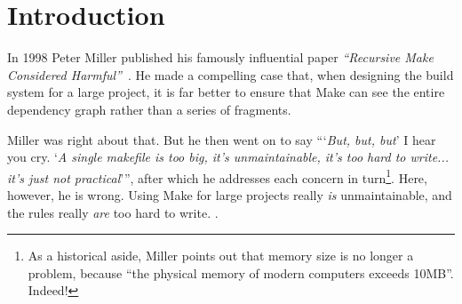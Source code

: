 \section{Introduction}

In 1998 Peter Miller published his famously influential paper
\emph{``Recursive Make Considered Harmful''}~\cite{miller:recursive_make}.
He made a compelling case that, when designing the build system for
a large project, it is far better to ensure that Make can see
the entire dependency graph rather than a series of fragments.

Miller was right about that.  But he then went on to say ```\emph{But, but, but}'
I hear you cry.  `\emph{A single makefile is too big, it's unmaintainable,
it's too hard to write... it's just not practical}''', after which he
addresses each concern in turn\footnote{
As a historical aside, Miller points out that memory size is no
longer a problem, because
``the physical memory of modern computers exceeds 10MB''.  Indeed!}.
Here, however, he is wrong.  Using
Make for large projects really \emph{is} unmaintainable, and the rules really
\emph{are} too hard to write.  .

